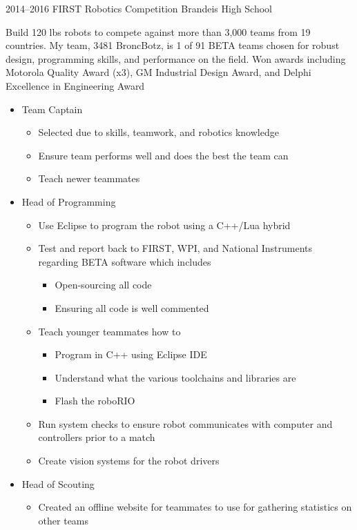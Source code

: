 \documentclass[]{friggeri-cv} %
\begin{document}
\begin{entrylist}

	\entry
	{2014--2016}
	{FIRST Robotics Competition}
	{Brandeis High School}
	{Build 120 lbs robots to compete against more than 3,000 teams from 19 countries. My team, 3481 BroncBotz, is 1 of 91 BETA teams chosen for robust design, programming skills, and performance on the field. Won awards including Motorola Quality Award (x3), GM Industrial Design Award, and Delphi Excellence in Engineering Award
		\begin{itemize}
			\item Team Captain
				\begin{itemize}
					\item Selected due to skills, teamwork, and robotics knowledge
					\item Ensure team performs well and does the best the team can
					\item Teach newer teammates
				\end{itemize}
			\item Head of Programming
				\begin{itemize}
					\item Use Eclipse to program the robot using a C++/Lua hybrid
					\item Test and report back to FIRST, WPI, and National Instruments regarding BETA software which includes
						\begin{itemize}
							\item Open-sourcing all code
							\item Ensuring all code is well commented
						\end{itemize}
					\item Teach younger teammates how to
						\begin{itemize}
							\item Program in C++ using Eclipse IDE
							\item Understand what the various toolchains and libraries are
							\item Flash the roboRIO
						\end{itemize}
					\item Run system checks to ensure robot communicates with computer and controllers prior to a match
					\item Create vision systems for the robot drivers
				\end{itemize}
			\item Head of Scouting
				\begin{itemize}
					\item Created an offline website for teammates to use for gathering statistics on other teams

\end{itemize}
\end{itemize}}
\end{entrylist}
\end{document}
